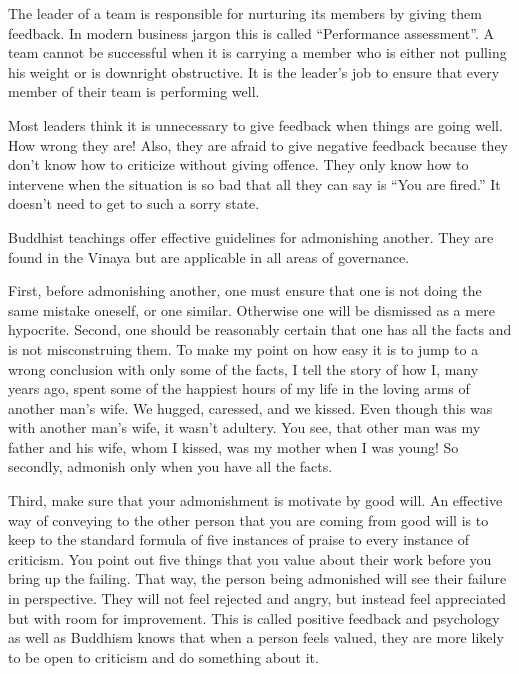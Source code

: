 \documentclass[11pt, openany]{book}
\begin{document}
The leader of a team is responsible for nurturing its members by giving them feedback. In modern business jargon this is called “Performance assessment”. A team cannot be successful when it is carrying a member who is either not pulling his weight or is downright obstructive. It is the leader’s job to ensure that every member of their team is performing well.

Most leaders think it is unnecessary to give feedback when things are going well. How wrong they are! Also, they are afraid to give negative feedback because they don’t know how to criticize without giving offence. They only know how to intervene when the situation is so bad that all they can say is “You are fired.” It doesn’t need to get to such a sorry state.

Buddhist teachings offer effective guidelines for admonishing another. They are found in the Vinaya but are applicable in all areas of governance.

First, before admonishing another, one must ensure that one is not doing the same mistake oneself, or one similar. Otherwise one will be dismissed as a mere hypocrite.
Second, one should be reasonably certain that one has all the facts and is not misconstruing them. To make my point on how easy it is to jump to a wrong conclusion with only some of the facts, I tell the story of how I, many years ago, spent some of the happiest hours of my life in the loving arms of another man’s wife. We hugged, caressed, and we kissed. Even though this was with another man’s wife, it wasn’t adultery. You see, that other man was my father and his wife, whom I kissed, was my mother when I was young! So secondly, admonish only when you have all the facts.

Third, make sure that your admonishment is motivate by good will. An effective way of conveying to the other person that you are coming from good will is to keep to the standard formula of five instances of praise to every instance of criticism. You point out five things that you value about their work before you bring up the failing. That way, the person being admonished will see their failure in perspective. They will not feel rejected and angry, but instead feel appreciated but with room for improvement. This is called positive feedback and psychology as well as Buddhism knows that when a person feels valued, they are more likely to be open to criticism and do something about it.
\end{document}
